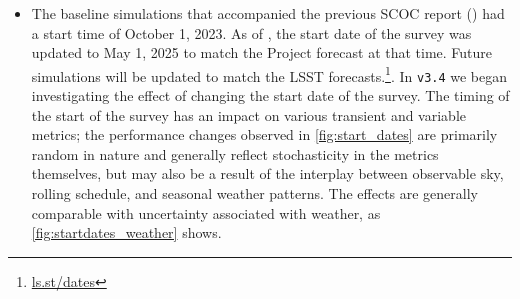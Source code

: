 \begin{itemize}
\item The baseline simulations that accompanied the previous SCOC report () had a start time of October 1, 2023. As of , the start date of the survey was updated to  May 1, 2025 to match the Project forecast at that time. %
Future simulations will be updated to match the LSST forecasts.\footnote{\url{ls.st/dates}}. In \texttt{v3.4} we began investigating the effect of changing the start date of the survey. The timing of the start of the survey has an impact on various transient and variable  metrics; the performance changes observed in \autoref{fig:start_dates} are primarily random in nature and generally reflect stochasticity in the metrics themselves, but may also be a result of the interplay between observable sky, rolling schedule, and seasonal weather patterns. The effects are generally comparable with uncertainty associated with weather, as \autoref{fig:startdates_weather} shows.
\end{itemize}



